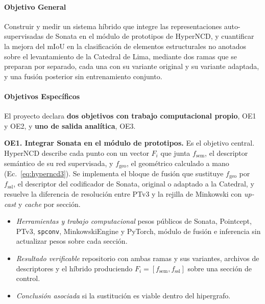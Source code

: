 \paragraph*{Objetivo General}

Construir y medir un sistema híbrido que integre las representaciones
auto-supervisadas de Sonata en el módulo de prototipos de HyperNCD, y cuantificar
la mejora del mIoU en la clasificación de elementos estructurales no anotados
sobre el levantamiento de la Catedral de Lima, mediante dos ramas que se preparan por separado, cada una con su variante
original y su variante adaptada, y una fusión posterior sin entrenamiento conjunto.

\paragraph*{Objetivos Específicos}

El proyecto declara \textbf{dos objetivos con trabajo computacional propio}, OE1
y OE2, y \textbf{uno de salida analítica}, OE3.

\medskip
\noindent\textbf{OE1. Integrar Sonata en el módulo de prototipos.} Es el objetivo central. HyperNCD describe cada punto con un vector $F_i$ que
junta $f_{\mathrm{sem}}$, el descriptor semántico de su red supervisada, y
$f_{\mathrm{geo}}$, el geométrico calculado a mano (Ec.~\eqref{eq:hyperncd3}). Se
implementa el bloque de fusión que sustituye $f_{\mathrm{geo}}$ por
$f_{\mathrm{ssl}}$, el descriptor del codificador de Sonata, original o adaptado a la Catedral, y resuelve
la diferencia de resolución entre PTv3 y la rejilla de Minkowski con
\emph{up-cast} y \emph{cache} por sección.

\begin{itemize}\setlength{\itemsep}{0pt}
\item \textit{Herramientas y trabajo computacional} pesos públicos de Sonata,
Pointcept, PTv3, \texttt{spconv}, MinkowskiEngine y PyTorch, módulo de fusión e
inferencia sin actualizar pesos sobre cada sección.
\item \textit{Resultado verificable} repositorio con ambas ramas y sus variantes,
archivos de descriptores y el híbrido produciendo
$F_i=[f_{\mathrm{sem}},f_{\mathrm{ssl}}]$ sobre una sección de control.
\item \textit{Conclusión asociada} si la sustitución es viable dentro del
hipergrafo.
\end{itemize}

